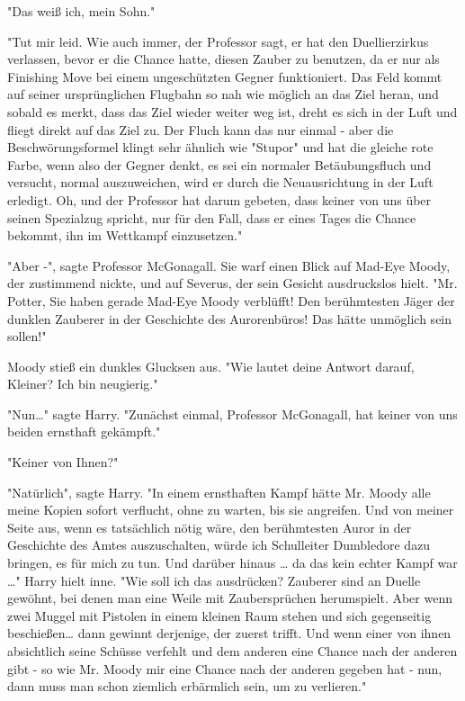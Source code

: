 {"Das weiß ich, mein Sohn."

"Tut mir leid. Wie auch immer, der Professor sagt, er hat den Duellierzirkus verlassen, bevor er die Chance hatte, diesen Zauber zu benutzen, da er nur als Finishing Move bei einem ungeschützten Gegner funktioniert. Das Feld kommt auf seiner ursprünglichen Flugbahn so nah wie möglich an das Ziel heran, und sobald es merkt, dass das Ziel wieder weiter weg ist, dreht es sich in der Luft und fliegt direkt auf das Ziel zu. Der Fluch kann das nur einmal - aber die Beschwörungsformel klingt sehr ähnlich wie "Stupor" und hat die gleiche rote Farbe, wenn also der Gegner denkt, es sei ein normaler Betäubungsfluch und versucht, normal auszuweichen, wird er durch die Neuausrichtung in der Luft erledigt. Oh, und der Professor hat darum gebeten, dass keiner von uns über seinen Spezialzug spricht, nur für den Fall, dass er eines Tages die Chance bekommt, ihn im Wettkampf einzusetzen."

"Aber -", sagte Professor McGonagall. Sie warf einen Blick auf Mad-Eye Moody, der zustimmend nickte, und auf Severus, der sein Gesicht ausdruckslos hielt. "Mr. Potter, Sie haben gerade Mad-Eye Moody verblüfft! Den berühmtesten Jäger der dunklen Zauberer in der Geschichte des Aurorenbüros! Das hätte unmöglich sein sollen!"

Moody stieß ein dunkles Glucksen aus. "Wie lautet deine Antwort darauf, Kleiner? Ich bin neugierig."

"Nun…" sagte Harry. "Zunächst einmal, Professor McGonagall, hat keiner von uns beiden ernsthaft gekämpft."

"Keiner von Ihnen?"

"Natürlich", sagte Harry. "In einem ernsthaften Kampf hätte Mr. Moody alle meine Kopien sofort verflucht, ohne zu warten, bis sie angreifen. Und von meiner Seite aus, wenn es tatsächlich nötig wäre, den berühmtesten Auror in der Geschichte des Amtes auszuschalten, würde ich Schulleiter Dumbledore dazu bringen, es für mich zu tun. Und darüber hinaus … da das kein echter Kampf war …" Harry hielt inne. "Wie soll ich das ausdrücken? Zauberer sind an Duelle gewöhnt, bei denen man eine Weile mit Zaubersprüchen herumspielt. Aber wenn zwei Muggel mit Pistolen in einem kleinen Raum stehen und sich gegenseitig beschießen… dann gewinnt derjenige, der zuerst trifft. Und wenn einer von ihnen absichtlich seine Schüsse verfehlt und dem anderen eine Chance nach der anderen gibt - so wie Mr. Moody mir eine Chance nach der anderen gegeben hat - nun, dann muss man schon ziemlich erbärmlich sein, um zu verlieren."

}
